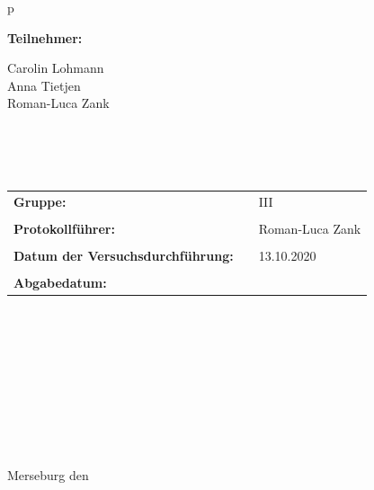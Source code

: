 \begin{center}
\begin{tabular}{p{\textwidth}}
\begin{center}
\Large{\textbf{Teilnehmer:}} \\ 
\end{center}
\begin{center}
\large{Carolin Lohmann \\
	Anna Tietjen \\
	Roman-Luca Zank} \\
\end{center}

\\ \\ \\

\begin{center}
\begin{tabular}{lll}
\large{\textbf{Gruppe:}} & & \large{III}\\
&&\\
\large{\textbf{Protokollführer:}} & & \large{Roman-Luca Zank}\\
&&\\
\large{\textbf{Datum der Versuchsdurchführung:}}&& \large{13.10.2020}\\
&&\\
\large{\textbf{Abgabedatum:}}&& \large{\todayDE}
\end{tabular}
\end{center}

\\ \\ \\ \\ \\ \\ \\ \\ \\
\large{Merseburg den \todayDE}

\end{tabular}
\end{center}
